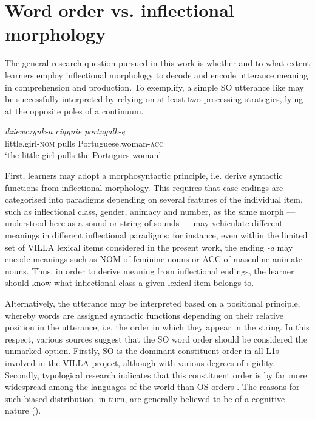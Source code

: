 \section{Word order vs. inflectional morphology}\label{sec:01:1}

The general research question pursued in this work is whether and to what extent learners employ inflectional morphology to decode and encode utterance meaning in comprehension and production. To exemplify, a simple SO utterance like  may be successfully interpreted by relying on at least two processing strategies, lying at the opposite poles of a continuum. 

\ea%
    \label{ex:01:3}
    \gll    \textit{dziewczynk-a ciągnie portugalk-ę}\\
            little.girl-\textsc{nom} pulls Portuguese.woman-\textsc{acc}\\
    \glt    ‘the little girl pulls the Portugues woman’
    \z

First, learners may adopt a morphosyntactic principle, i.e. derive syntactic functions from inflectional morphology. This requires that case endings are categorised into paradigms depending on several features of the individual item, such as inflectional class, gender, animacy and number, as the same morph — understood here as a sound or string of sounds — may vehiculate different meanings in different inflectional paradigms: for instance, even within the limited set of VILLA lexical items considered in the present work, the ending \textit{{}-a} may encode meanings such as NOM of feminine nouns or ACC of masculine animate nouns. Thus, in order to derive meaning from inflectional endings, the learner should know what inflectional class a given lexical item belongs to.

Alternatively, the utterance may be interpreted based on a positional principle, whereby words are assigned syntactic functions depending on their relative position in the utterance, i.e. the order in which they appear in the string. In this respect, various sources suggest that the SO word order should be considered the unmarked option. Firstly, SO is the dominant constituent order in all L1s involved in the VILLA project, although with various degrees of rigidity. Secondly, typological research indicates that this constituent order is by far more widespread among the languages of the world than OS orders \citep{Dryer2013b}. The reasons for such biased distribution, in turn, are generally believed to be of a cognitive nature (\citealt{SiewierskaBakker2008}).

